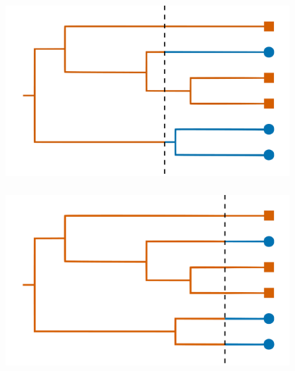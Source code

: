 \documentclass[aspectratio=169]{beamer}
\begin{document}
\begin{frame} \frametitle{\insertsection}

    \begin{center}

        \centering\includegraphics[width=0.8\textwidth]{images/tree-option1}
        
    \end{center}

\end{frame}


\begin{frame} \frametitle{\insertsection}

    \begin{center}

        \centering\includegraphics[width=0.8\textwidth]{images/tree-option2}

    \end{center}

\end{frame}
\end{document}
